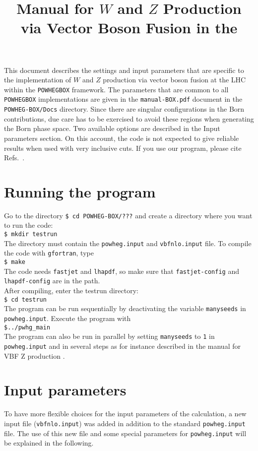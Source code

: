 \documentclass[a4paper,11pt]{article}
\title{Manual for $W$ and $Z$ Production via Vector Boson Fusion in the \POWHEGBOX{}}
\date{}
\newcommand\POWHEGBOX{{\tt POWHEG\;BOX}}
\begin{document}
\maketitle
%
\noindent
This document describes the settings and input parameters that are specific to
the implementation of $W$ and $Z$ production via vector boson fusion at the LHC within the
\POWHEGBOX{} framework. 
%
The parameters that are common to all \POWHEGBOX{} implementations are given in
the {\tt manual-BOX.pdf} document in the {\tt POWHEG-BOX/Docs}
directory. Since there are singular configurations in the Born contributions, due care has to be exercised 
to avoid these regions when generating the Born phase space. Two available options are described in 
the Input parameters section. On this account, the code is not expected to give 
reliable results when used with very inclusive cuts.
If you use our program, please cite
Refs.~\cite{SZ,Oleari:2003tc,Alioli:2010xd}.

\section*{Running the program}
Go to the directory
{\tt \$ cd POWHEG-BOX/???}
and create a directory where you want to run the code:
\\[2ex]
{\tt \$ mkdir testrun}
\\[2ex]
The directory must contain the {\tt powheg.input} and {\tt vbfnlo.input} file.
To compile the code with {\tt gfortran}, type 
\\[2ex]
{\tt \$ make}
\\[2ex]
The code needs {\tt fastjet} and {\tt lhapdf}, so make sure that {\tt fastjet-config} and 
{\tt lhapdf-config} are in the path.%
\\[2ex]
After compiling, enter the testrun directory:
\\[2ex]
{\tt \$ cd testrun}
\\[2ex]
The program can be run sequentially by deactivating the variable {\tt manyseeds} in {\tt powheg.input}. Execute the program with
\\[2ex]
{\tt \$../pwhg\_main}
\\[2ex]
The program can also be run in parallel by setting {\tt manyseeds} to {\tt 1} in {\tt powheg.input}
and in several steps as for instance described in the manual 
for VBF Z production \cite{JSZ}.
\\[2ex]
\section*{Input parameters}
To have more flexible choices for the input parameters of the calculation, a new input file 
({\tt vbfnlo.input}) was added 
in addition to the standard {\tt powheg.input} file. The use of this new file and some special parameters 
for {\tt powheg.input} will be explained in the following.
\end{document}
